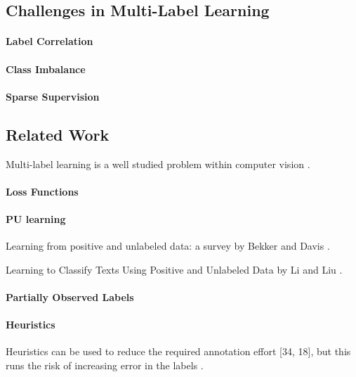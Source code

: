 \documentclass[lettersize,journal]{IEEEtran}
\begin{document}
\subsection{Challenges in Multi-Label Learning}
\paragraph{Label Correlation}
\paragraph{Class Imbalance}
\paragraph{Sparse Supervision}


\subsection{Related Work}
Multi-label learning is a well studied problem within computer vision \cite{mlsp}. 



\paragraph{Loss Functions}

\paragraph{PU learning} 
Learning from positive and unlabeled data: a survey by Bekker and Davis \cite{Bekker_2020}.

Learning to Classify Texts Using Positive and Unlabeled Data by Li and Liu \cite{Li_2003}.

\paragraph{Partially Observed Labels}

\paragraph{Heuristics}
Heuristics can be used to reduce the required
annotation effort [34, 18], but this runs the risk of increasing
error in the labels \cite{mlsp}.
\end{document}
